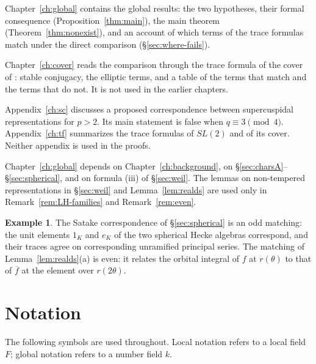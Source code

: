 \documentclass[12pt,letterpaper,openany]{book}
\theoremstyle{plain}
\theoremstyle{definition}
\newtheorem{example}[theorem]{Example}
\theoremstyle{remark}
\theoremstyle{remark}
\begin{document}
Chapter~\ref{ch:global} contains the global results: the two hypotheses,
their formal consequence (Proposition~\ref{thm:main}), the main
theorem (Theorem~\ref{thm:nonexist}), and an account of which terms of the
trace formulas match under the direct comparison
(\S\ref{sec:where-fails}).

Chapter~\ref{ch:cover} reads the comparison through the trace formula of
the cover of \cite{JC}: stable conjugacy, the elliptic terms, and a table
of the terms that match and the terms that do not. It is not used in the
earlier chapters.

Appendix~\ref{ch:sc} discusses a proposed correspondence between
supercuspidal representations for $p>2$. Its main statement is false when
$q\equiv3\pmod4$. Appendix~\ref{ch:tf} summarizes the trace formulas of
$SL(2)$ and of its cover. Neither appendix is used in the proofs.

Chapter~\ref{ch:global} depends on Chapter~\ref{ch:background}, on
\S\ref{sec:charsA}--\S\ref{sec:spherical}, and on formula (iii) of
\S\ref{sec:weil}. The lemmas on non-tempered representations in
\S\ref{sec:weil} and Lemma~\ref{lem:realds} are used only in
Remark~\ref{rem:LH-families} and Remark~\ref{rem:even}.

\begin{example}
The Satake correspondence of \S\ref{sec:spherical} is an odd matching: the
unit elements $1_K$ and $e_K$ of the two spherical Hecke algebras
correspond, and their traces agree on corresponding unramified principal
series. The matching of Lemma~\ref{lem:realds}(a) is even: it relates the
orbital integral of $f$ at $r(\theta)$ to that of $\overline f$ at the
element over $r(2\theta)$.
\end{example}

\section{Notation}\label{sec:notation}

The following symbols are used throughout. Local notation refers to a
local field $F$; global notation refers to a number field $k$.
\end{document}
